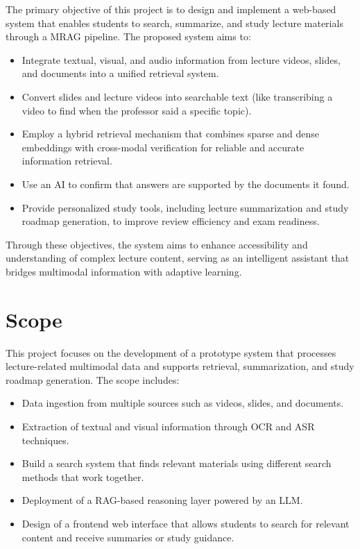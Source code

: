 The primary objective of this project is to design and implement a web-based system that enables students to search, summarize, and study lecture materials through a MRAG pipeline. The proposed system aims to:

\begin{itemize}
    \item Integrate textual, visual, and audio information from lecture videos, slides, and documents into a unified retrieval system. 
    \item Convert slides and lecture videos into searchable text (like transcribing a video to find when the professor said a specific topic).
    \item Employ a hybrid retrieval mechanism that combines sparse and dense embeddings with cross-modal verification for reliable and accurate information retrieval.
    \item Use an AI to confirm that answers are supported by the documents it found.
    \item Provide personalized study tools, including lecture summarization and study roadmap generation, to improve review efficiency and exam readiness.
\end{itemize}

Through these objectives, the system aims to enhance accessibility and understanding of complex lecture content, serving as an intelligent assistant that bridges multimodal information with adaptive learning.

\section{Scope}

This project focuses on the development of a prototype system that processes lecture-related multimodal data and supports retrieval, summarization, and study roadmap generation. The scope includes:

\begin{itemize}
    \item Data ingestion from multiple sources such as videos, slides, and documents.
    \item Extraction of textual and visual information through OCR and ASR techniques.
    \item Build a search system that finds relevant materials using different search methods that work together.
    \item Deployment of a RAG-based reasoning layer powered by an LLM.
    \item Design of a frontend web interface that allows students to search for relevant content and receive summaries or study guidance.
\end{itemize}

